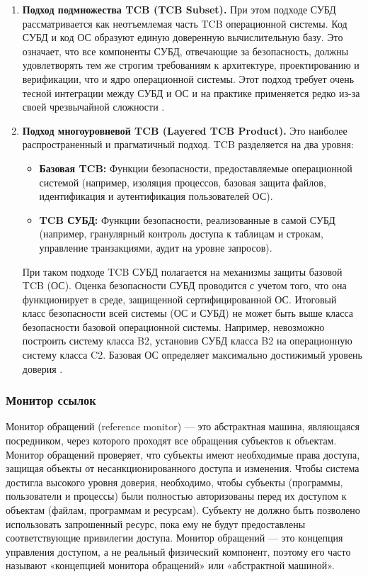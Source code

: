 \begin{enumerate}
	\item \textbf{Подход подмножества TCB (TCB Subset).} При этом подходе СУБД рассматривается как неотъемлемая часть TCB операционной системы. Код СУБД и код ОС образуют единую доверенную вычислительную базу. Это означает, что все компоненты СУБД, отвечающие за безопасность, должны удовлетворять тем же строгим требованиям к архитектуре, проектированию и верификации, что и ядро операционной системы. Этот подход требует очень тесной интеграции между СУБД и ОС и на практике применяется редко из-за своей чрезвычайной сложности \cite[Appendix B]{PurpleBook}.
	\item \textbf{Подход многоуровневой TCB (Layered TCB Product).} Это наиболее распространенный и прагматичный подход. TCB разделяется на два уровня:
	\begin{itemize}
		\item \textbf{Базовая TCB:} Функции безопасности, предоставляемые операционной системой (например, изоляция процессов, базовая защита файлов, идентификация и аутентификация пользователей ОС).
		\item \textbf{TCB СУБД:} Функции безопасности, реализованные в самой СУБД (например, гранулярный контроль доступа к таблицам и строкам, управление транзакциями, аудит на уровне запросов).
	\end{itemize}
	При таком подходе TCB СУБД полагается на механизмы защиты базовой TCB (ОС). Оценка безопасности СУБД проводится с учетом того, что она функционирует в среде, защищенной сертифицированной ОС. Итоговый класс безопасности всей системы (ОС и СУБД) не может быть выше класса безопасности базовой операционной системы. Например, невозможно построить систему класса B2, установив СУБД класса B2 на операционную систему класса C2. Базовая ОС определяет максимально достижимый уровень доверия \cite[Appendix B]{PurpleBook}.
\end{enumerate}

\subsubsection{Монитор ссылок}
Монитор обращений (reference monitor) --- это абстрактная машина, являющаяся посредником, через которого проходят все обращения субъектов к объектам. Монитор обращений проверяет, что субъекты имеют необходимые права доступа, защищая объекты от несанкционированного доступа и изменения.
Чтобы система достигла высокого уровня доверия, необходимо, чтобы субъекты (программы, пользователи и процессы) были полностью авторизованы перед их доступом к объектам (файлам, программам и ресурсам).
Субъекту не должно быть позволено использовать запрошенный ресурс, пока ему не будут предоставлены соответствующие привилегии доступа. Монитор обращений --- это концепция управления доступом, а не реальный физический компонент, поэтому его часто называют «концепцией монитора обращений» или «абстрактной машиной». \cite{CISSP}

